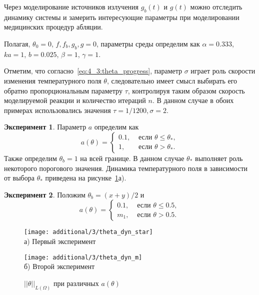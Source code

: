 Через моделирование источников излучения $g_b(t)$ и $g(t)$ можно отследить динамику системы и замерить
интересующие параметры при моделировании медицинских процедур абляции.

Полагая, $\theta_0 = 0$, $f, f_b, g_b, g = 0$, параметры среды определим как
$\alpha = 0.333$,
$ka = 1$,
$b = 0.025$,
$\beta = 1$,
$\gamma = 1$.

Отметим, что согласно~\eqref{eq:4_3:theta_progress},
параметр $\sigma$ играет роль скорости изменения температурного поля $\theta$, следовательно
имеет смысл выбирать его обратно пропорциональным параметру $\tau$,
контролируя таким образом скорость моделируемой реакции и количество итераций $n$.
В данном случае в обоих примерах использовались значения $\tau = 1/1200, \sigma = 2$.

\textbf{Эксперимент 1}.
Параметр $a$ определим как
\[
    a(\theta)=
    \begin{cases}
        0.1, & \text { если } \theta \leq \theta_{*}, \\
        1, & \text { если } \theta>\theta_{*}.
    \end{cases}
\]
Также определим $\theta_b = 1$ на всей границе.
В данном случае $\theta_{*}$ выполняет роль некоторого порогового значения.
Динамика температурного поля в зависимости от выбора $\theta_*$ приведена на рисунке~\ref{fig:4_3:theta_dyn_diff}а).


\textbf{Эксперимент 2}.
Положим $\theta_b = (x + y) /2$ и
\[
    a(\theta)=
    \begin{cases}
        0.1, & \text { если } \theta \leq 0.5, \\
        m_1, & \text { если } \theta > 0.5.
    \end{cases}
\]

\begin{figure}[h!t]
    \begin{minipage}[b][][b]{0.49\linewidth}
        \centering
        \texttt{[image: additional/3/theta\_dyn\_star]} \\ а) Первый эксперимент
    \end{minipage}
    \hfill
    \begin{minipage}[b][][b]{0.49\linewidth}
        \centering
        \texttt{[image: additional/3/theta\_dyn\_m]} \\ б) Второй эксперимент
    \end{minipage}
    \caption{$||\theta||_{L(\Omega)}$ при различных $a(\theta)$}
    \label{fig:4_3:theta_dyn_diff}
\end{figure}

